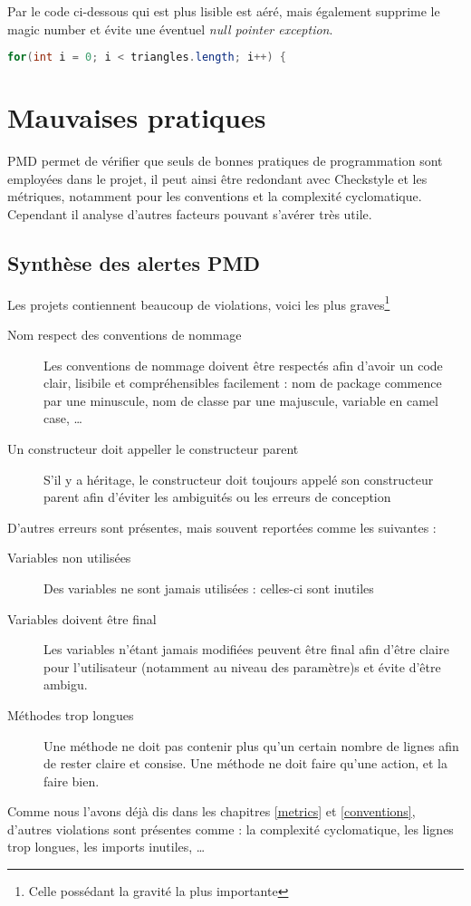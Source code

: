 \documentclass[12pt,a4paper,openany]{book}
\begin{document}
Par le code ci-dessous qui est plus lisible est aéré, mais également supprime le magic number et évite une éventuel \textit{null pointer exception}.
\begin{lstlisting}[language=Java,numbers=none]
for(int i = 0; i < triangles.length; i++) {	
\end{lstlisting}

\chapter{Mauvaises pratiques}
PMD permet de vérifier que seuls de bonnes pratiques de programmation sont employées dans le projet, il peut ainsi être redondant avec Checkstyle et les
métriques, notamment pour les conventions et la complexité cyclomatique. Cependant il analyse d'autres facteurs pouvant s'avérer très utile.

\section{Synthèse des alertes PMD}
Les projets contiennent beaucoup de violations, voici les plus graves\footnote{Celle possédant la gravité la plus importante} 
\begin{description}
	\item[Nom respect des conventions de nommage] Les conventions de nommage doivent être respectés afin d'avoir un code clair, lisibile et
		compréhensibles facilement : nom de package commence par une minuscule, nom de classe par une majuscule, variable en camel case, \ldots
	\item[Un constructeur doit appeller le constructeur parent] S'il y a héritage, le constructeur doit toujours appelé son constructeur parent afin
		d'éviter les ambiguités ou les erreurs de conception
\end{description}
D'autres erreurs sont présentes, mais souvent reportées comme les suivantes : 
\begin{description}
	\item[Variables non utilisées] Des variables ne sont jamais utilisées : celles-ci sont inutiles
	\item[Variables doivent être final] Les variables n'étant jamais modifiées peuvent être final afin d'être claire pour l'utilisateur (notamment au
		niveau des paramètre)s et évite d'être ambigu.
	\item[Méthodes trop longues] Une méthode ne doit pas contenir plus qu'un certain nombre de lignes afin de rester claire et consise. Une méthode ne
		doit faire qu'une action, et la faire bien.
\end{description}
\begin{remarque}
	Comme nous l'avons déjà dis dans les chapitres \ref{metrics} et \ref{conventions}, d'autres violations sont présentes comme : la complexité
	cyclomatique, les lignes trop longues, les imports inutiles, \ldots
\end{remarque}
\end{document}
